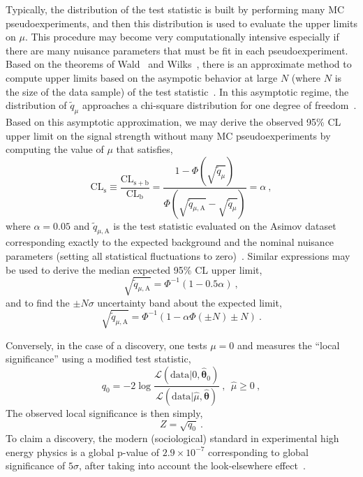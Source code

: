 Typically, the distribution of the test statistic is built by
performing many MC pseudoexperiments, and then this distribution is used to
evaluate the upper limits on $\mu$. This procedure may become very
computationally intensive especially if there are many nuisance
parameters that must be fit in each pseudoexperiment. Based on the
theorems of Wald~\cite{Wald} and Wilks~\cite{Wilks:1938dza}, there is an approximate method to
compute upper limits based on the asympotic behavior at large $N$
(where $N$ is the size of the data sample) of the test
statistic~\cite{Cowan:2010js}. In this asymptotic regime, the
distribution of $\tilde q_{\mu}$ approaches a chi-square distribution
for one degree of freedom~\cite{Wilks:1938dza}. Based on this asymptotic approximation, we
may derive the observed 95\% CL upper limit on the signal strength
without many MC pseudoexperiments by computing the value of $\mu$ that satisfies,
\begin{equation}
\mathrm{CL}_{\mathrm{s}}\equiv
\frac{\mathrm{CL}_{\mathrm{s+b}}}{\mathrm{CL}_{\mathrm{b}}} = 
\frac{1-\Phi(\sqrt{\tilde
    q_{\mu}})}{\Phi(\sqrt{\tilde q_{\mu,\mathrm{A}}} - \sqrt{\tilde
    q_{\mu}} ) } = \alpha ~,
\end{equation}
where $\alpha = 0.05$ and $\tilde q_{\mu,\mathrm{A}}$ is the test statistic evaluated on
the Asimov dataset~\cite{Asimov} corresponding exactly to the expected
background and the nominal nuisance parameters (setting all
statistical fluctuations to zero)~\cite{Cowan:2010js,LHCCLs}. Similar
expressions may be used to derive the median expected 95\% CL upper limit, 
\begin{equation}
\sqrt{\tilde q_{\mu,\mathrm{A}}} = \Phi^{-1}(1-0.5\alpha) ~,
\end{equation}
and to find the $\pm N\sigma$ uncertainty band about the expected limit,
\begin{equation}
\sqrt{\tilde q_{\mu,\mathrm{A}}} = \Phi^{-1}(1-\alpha\Phi(\pm N)\pm N)~.
\end{equation}

Conversely, in the case of a discovery, one tests $\mu=0$ and measures
the ``local significance'' using a modified test statistic,
\begin{equation}
q_{0} = -2\log\frac{\mathcal
  L(\mathrm{data}|0,\boldsymbol{\hat\theta}_{0})}{\mathcal
  L(\mathrm{data}|\hat\mu, \boldsymbol{\hat\theta})} ~, ~~ \hat\mu\geq 0~,
\end{equation}
The observed local significance is then simply,
\begin{equation}
Z = \sqrt{q_0}~.
\end{equation}
To claim a discovery, the modern (sociological) standard in experimental high energy
physics is a global p-value of $2.9\times10^{-7}$ corresponding to global
significance of $5\sigma$, after taking into account the
look-elsewhere effect~\cite{Lyons:2013yja,Cousins:2013hry,Gross:2010qma}.

